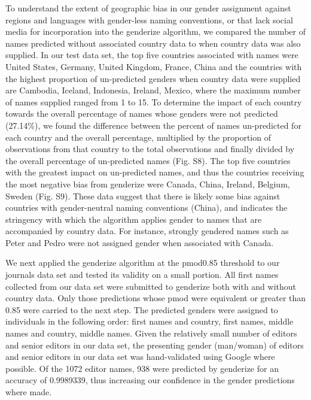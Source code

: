 \documentclass[11pt,]{article}
\begin{document}
To understand the extent of geographic bias in our gender assignment
against regions and languages with gender-less naming conventions, or
that lack social media for incorporation into the genderize algorithm,
we compared the number of names predicted without associated country
data to when country data was also supplied. In our test data set, the
top five countries associated with names were United States, Germany,
United Kingdom, France, China and the countries with the highest
proportion of un-predicted genders when country data were supplied are
Cambodia, Iceland, Indonesia, Ireland, Mexico, where the maximum number
of names supplied ranged from 1 to 15. To determine the impact of each
country towards the overall percentage of names whose genders were not
predicted (27.14\%), we found the difference between the percent of
names un-predicted for each country and the overall percentage,
multiplied by the proportion of observations from that country to the
total observations and finally divided by the overall percentage of
un-predicted names (Fig. S8). The top five countries with the greatest
impact on un-predicted names, and thus the countries receiving the most
negative bias from genderize were Canada, China, Ireland, Belgium,
Sweden (Fig. S9). These data suggest that there is likely some bias
against countries with gender-neutral naming conventions (China), and
indicates the stringency with which the algorithm applies gender to
names that are accompanied by country data. For instance, strongly
gendered names such as Peter and Pedro were not assigned gender when
associated with Canada.

We next applied the genderize algorithm at the pmod0.85 threshold to our
journals data set and tested its validity on a small portion. All first
names collected from our data set were submitted to genderize both with
and without country data. Only those predictions whose pmod were
equivalent or greater than 0.85 were carried to the next step. The
predicted genders were assigned to individuals in the following order:
first names and country, first names, middle names and country, middle
names. Given the relatively small number of editors and senior editors
in our data set, the presenting gender (man/woman) of editors and senior
editors in our data set was hand-validated using Google where possible.
Of the 1072 editor names, 938 were predicted by genderize for an
accuracy of 0.9989339, thus increasing our confidence in the gender
predictions where made.
\end{document}
